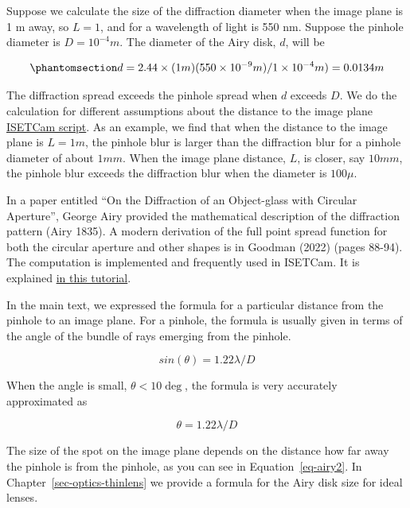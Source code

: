\documentclass[
  letterpaper,
]{book}
\begin{document}
Suppose we calculate the size of the diffraction diameter when the image
plane is 1 m away, so \(L=1\), and for a wavelength of light is 550 nm.
Suppose the pinhole diameter is \(D = 10^{-4} m\). The diameter of the
Airy disk, \(d\), will be

\begin{equation}\phantomsection\label{eq-airydisk1}{
d = 2.44 \times (1 m) (550 \times 10^{-9} m )/ 1 \times 10^{-4}m) = 0.0134 m
}\end{equation}

The diffraction spread exceeds the pinhole spread when \(d\) exceeds
\(D\). We do the calculation for different assumptions about the
distance to the image plane \href{./code/fise_diffraction.html}{ISETCam
script}. As an example, we find that when the distance to the image
plane is \(L = 1m\), the pinhole blur is larger than the diffraction
blur for a pinhole diameter of about \(1 mm\). When the image plane
distance, \(L\), is closer, say \(10 mm\), the pinhole blur exceeds the
diffraction blur when the diameter is \(100 \mu\).

\begin{tcolorbox}[enhanced jigsaw, opacitybacktitle=0.6, breakable, bottomtitle=1mm, leftrule=.75mm, colframe=quarto-callout-note-color-frame, colback=white, left=2mm, opacityback=0, title=\textcolor{quarto-callout-note-color}{\faInfo}\hspace{0.5em}{The diameter of the diffraction point spread}, toptitle=1mm, bottomrule=.15mm, titlerule=0mm, arc=.35mm, colbacktitle=quarto-callout-note-color!10!white, toprule=.15mm, rightrule=.15mm, coltitle=black]

In a paper entitled ``On the Diffraction of an Object-glass with
Circular Aperture'', George Airy provided the mathematical description
of the diffraction pattern (Airy 1835). A modern derivation of the full
point spread function for both the circular aperture and other shapes is
in Goodman (2022) (pages 88-94). The computation is implemented and
frequently used in ISETCam. It is explained
\href{https://htmlpreview.github.io/?https://github.com/ISET/isetcam/blob/main/tutorials/optics/t_opticsAiryDisk.html}{in
this tutorial}.

In the main text, we expressed the formula for a particular distance
from the pinhole to an image plane. For a pinhole, the formula is
usually given in terms of the angle of the bundle of rays emerging from
the pinhole.

\[sin(\theta) = 1.22 \lambda / D\]

When the angle is small, \(\theta < 10 \deg\), the formula is very
accurately approximated as

\[
\theta = 1.22 \lambda / D
\]

The size of the spot on the image plane depends on the distance how far
away the pinhole is from the pinhole, as you can see in
Equation~\ref{eq-airy2}. In Chapter~\ref{sec-optics-thinlens} we provide
a formula for the Airy disk size for ideal lenses.

\end{tcolorbox}
\end{document}

